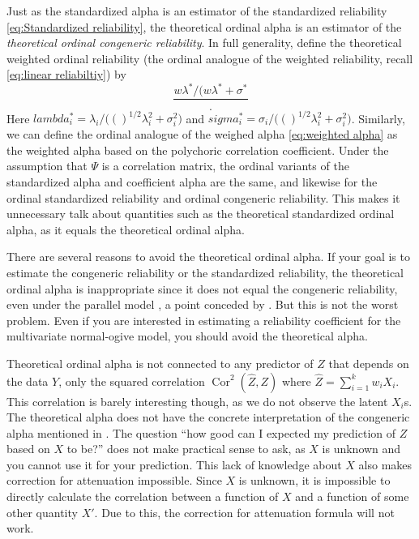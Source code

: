 \documentclass[twoside]{article}
\DeclareMathOperator{\Cor}{Cor}
\renewcommand{\sqrt}[1]{{(#1)^{1/2}}}
\begin{document}
Just as the standardized alpha is an estimator of the standardized reliability \cref{eq:Standardized reliability}, the theoretical ordinal alpha is an estimator of the \textit{theoretical ordinal congeneric reliability}. In full generality, define the theoretical weighted ordinal reliability (the ordinal analogue of the weighted reliability, recall \eqref{eq:linear reliabiltiy}) by
\begin{equation}
\frac{w\lambda^*/(w\lambda^* + \sigma^*}.
\end{equation}
Here $lambda_i^* = \lambda_i/\sqrt(\lambda_i^2 + \sigma_i^2)$ and $sigma_i^* = \sigma_i/\sqrt(\lambda_i^2 + \sigma_i^2)$. Similarly, we can define the ordinal analogue of the weighed alpha \eqref{eq:weighted alpha} as the weighted alpha based on the polychoric correlation coefficient. Under the assumption that $\Psi$ is a correlation matrix, the ordinal variants of the standardized alpha and coefficient alpha are the same, and likewise for the ordinal standardized reliability and ordinal congeneric reliability. This makes it unnecessary talk about quantities such as the theoretical standardized ordinal alpha, as it equals the theoretical ordinal alpha. 

There are several reasons to avoid the theoretical ordinal alpha. If your
goal is to estimate the congeneric reliability or the standardized
reliability, the theoretical ordinal alpha is inappropriate since
it does not equal the congeneric reliability, even under the parallel
model \citep[p. 1062, "Misconception 2"]{Chalmers2018-fj}, a point
conceded by \citet{Zumbo2019-lm}. But this is not the worst problem.
Even if you are interested in estimating a reliability coefficient
for the multivariate normal-ogive model, you should avoid the theoretical
alpha.

Theoretical ordinal alpha is not connected to any predictor
of $Z$ that depends on the data $Y$, only the squared correlation $\Cor^{2}(\hat{Z},Z)$ where $\hat{Z}=\sum_{i=1}^k w_iX_i$. This correlation is barely interesting though, as we do not observe
the latent $X_{i}$s. The theoretical alpha does not have the concrete
interpretation of the congeneric alpha mentioned in . The question
``how good can I expected my prediction of $Z$ based on $X$ to
be?'' does not make practical sense to ask, as $X$ is unknown and you cannot use it for your prediction. This
lack of knowledge about $X$ also makes correction for attenuation
impossible. Since $X$ is unknown, it is impossible to directly calculate
the correlation between a function of $X$ and a function of some
other quantity $X'$. Due to this, the correction for attenuation formula
will not work. 
\end{document}

